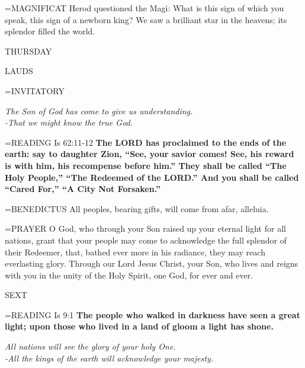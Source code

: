\hangindent=\parindent \small{MAGNIFICAT 	Herod questioned the Magi: What is this sign of which you speak, this sign of a newborn king? We saw a brilliant star in the heavens; its splendor filled the world.\\}

\begin{center}
\normalsize THURSDAY
\end{center}

\begin{flushleft}\normalsize LAUDS\\\end{flushleft}

\hangindent=\parindent \small{INVITATORY}
\begin{center}
\textit{The Son of God has come to give us understanding.\\}
\textit{-That we might know the true God.\\}
\end{center}

\hangindent=\parindent \small{READING}    Is 62:11-12 \textbf{   The LORD has proclaimed to the ends of the earth: say to daughter Zion, “See, your savior comes! See, his reward is with him, his recompense before him.” They shall be called “The Holy People,” “The Redeemed of the LORD.” And you shall be called “Cared For,” “A City Not Forsaken.”\\}

\hangindent=\parindent \small{BENEDICTUS 	All peoples, bearing gifts, will come from afar, alleluia.\\}

\hangindent=\parindent \small{PRAYER 	O God, who through your Son raised up your eternal light for all nations, grant that your people may come to acknowledge the full splendor of their Redeemer, that, bathed ever more in his radiance, they may reach everlasting glory. Through our Lord Jesus Christ, your Son, who lives and reigns with you in the unity of the Holy Spirit, one God, for ever and ever.}

\begin{flushleft}\normalsize SEXT\\\end{flushleft}

\hangindent=\parindent \small{READING}   Is 9:1 \textbf{  The people who walked in darkness have seen a great light; upon those who lived in a land of gloom a light has shone.}

\begin{center}
\textit{All nations will see the glory of your holy One.\\
-All the kings of the earth will acknowledge your majesty.}
\end{center}

